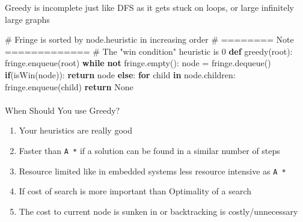 \documentclass[
  letterpaper,
  DIV=11,
  numbers=noendperiod]{scrartcl}
\makeatletter
\let\oldparagraph\paragraph
\renewcommand{\paragraph}{
    \@ifstar
      \xxxParagraphStar
      \xxxParagraphNoStar
  }
\newcommand{\xxxParagraphStar}[1]{\oldparagraph*{#1}\mbox{}}
\newcommand{\xxxParagraphNoStar}[1]{\oldparagraph{#1}\mbox{}}
\newenvironment{Shaded}{\begin{snugshade}}{\end{snugshade}}
\newcommand{\CommentTok}[1]{\textcolor[rgb]{0.37,0.37,0.37}{#1}}
\newcommand{\ControlFlowTok}[1]{\textcolor[rgb]{0.00,0.23,0.31}{\textbf{#1}}}
\newcommand{\KeywordTok}[1]{\textcolor[rgb]{0.00,0.23,0.31}{\textbf{#1}}}
\newcommand{\NormalTok}[1]{\textcolor[rgb]{0.00,0.23,0.31}{#1}}
\newcommand{\OperatorTok}[1]{\textcolor[rgb]{0.37,0.37,0.37}{#1}}
\newcommand{\VariableTok}[1]{\textcolor[rgb]{0.07,0.07,0.07}{#1}}
\providecommand{\tightlist}{%
  \setlength{\itemsep}{0pt}\setlength{\parskip}{0pt}}\usepackage{longtable,booktabs,array}
\makeatother
\begin{document}
\begin{tcolorbox}[enhanced jigsaw, opacitybacktitle=0.6, title=\textcolor{quarto-callout-warning-color}{\faExclamationTriangle}\hspace{0.5em}{Warning}, toptitle=1mm, left=2mm, breakable, titlerule=0mm, bottomtitle=1mm, bottomrule=.15mm, leftrule=.75mm, colframe=quarto-callout-warning-color-frame, arc=.35mm, rightrule=.15mm, toprule=.15mm, coltitle=black, colback=white, opacityback=0, colbacktitle=quarto-callout-warning-color!10!white]

Greedy is incomplete just like DFS as it gets stuck on loops, or large
infinitely large graphs

\end{tcolorbox}

\begin{Shaded}
\begin{Highlighting}[]
\CommentTok{\# Fringe is sorted by node.heuristic in increasing order}
\CommentTok{\# ======== Note =============}
\CommentTok{\# The "win condition" heuristic is 0  }
\KeywordTok{def}\NormalTok{ greedy(root):}
\NormalTok{  fringe.enqueue(root)}
  \ControlFlowTok{while} \KeywordTok{not}\NormalTok{ fringe.empty():}
\NormalTok{    node }\OperatorTok{=}\NormalTok{ fringe.dequeue()}
    \ControlFlowTok{if}\NormalTok{(isWin(node)):}
      \ControlFlowTok{return}\NormalTok{ node}
    \ControlFlowTok{else}\NormalTok{:}
      \ControlFlowTok{for}\NormalTok{ child }\KeywordTok{in}\NormalTok{ node.children:}
\NormalTok{        fringe.enqueue(child)}
  \ControlFlowTok{return} \VariableTok{None}
\end{Highlighting}
\end{Shaded}

\paragraph{When Should You use
Greedy?}\label{when-should-you-use-greedy}

\begin{enumerate}
\def\labelenumi{\arabic{enumi}.}
\tightlist
\item
  Your heuristics are really good
\item
  Faster than \texttt{A\ *} if a solution can be found in a similar
  number of steps
\item
  Resource limited like in embedded systems less resource intensive as
  \texttt{A\ *}
\item
  If cost of search is more important than Optimality of a search
\item
  The cost to current node is sunken in or backtracking is
  costly/unnecessary
\end{enumerate}
\end{document}
